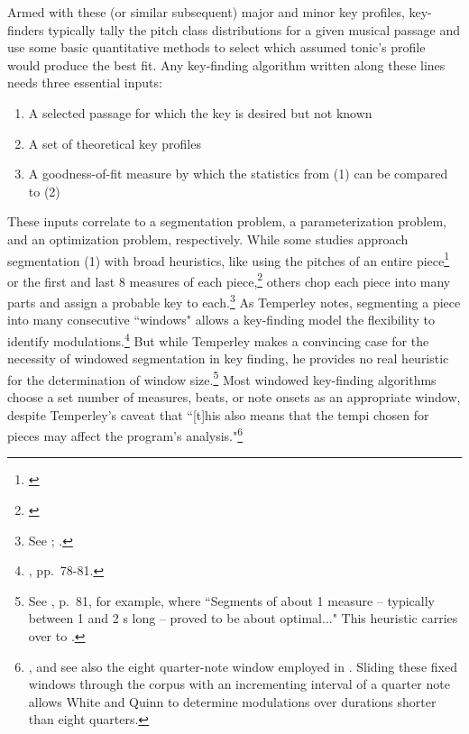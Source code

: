 Armed with these (or similar subsequent) major and minor key profiles, key-finders typically tally the pitch class distributions for a given musical passage and use some basic quantitative methods to select which assumed tonic's profile would produce the best fit.  Any key-finding algorithm written along these lines needs three essential inputs:
\begin{enumerate}
	\item A selected passage for which the key is desired but not known
	\item A set of theoretical key profiles
	\item A goodness-of-fit measure by which the statistics from (1) can be compared to (2)
\end{enumerate}
These inputs correlate to a segmentation problem, a parameterization problem, and an optimization problem, respectively.  While some studies approach segmentation (1) with broad heuristics, like using the pitches of an entire piece\footnote{\cite{krumhansl1990}} or the first and last 8 measures of each piece,\footnote{\cite{albrecht2013}} others chop each piece into many parts and assign a probable key to each.\footnote{See \cite{temperley2007}; \cite{white2013}.}  As Temperley notes, segmenting a piece into many consecutive ``windows" allows a key-finding model the flexibility to identify modulations.\footnote{\cite{temperley1999}, pp.\ 78-81.}  But while Temperley makes a convincing case for the necessity of windowed segmentation in key finding, he provides no real heuristic for the determination of window size.\footnote{See \cite{temperley1999}, p.\ 81, for example, where ``Segments of about 1 measure -- typically between 1 and 2 s long -- proved to be about optimal..."  This heuristic carries over to \cite{temperley2007}.}  Most windowed key-finding algorithms choose a set number of measures, beats, or note onsets as an appropriate window, despite Temperley's caveat that ``[t]his also means that the tempi chosen for pieces may affect the program's analysis."\footnote{\cite{temperley1999}, and see also the eight quarter-note window employed in \cite{wq2017}.  Sliding these fixed windows through the corpus with an incrementing interval of a quarter note allows White and Quinn to determine modulations over durations shorter than eight quarters.}


